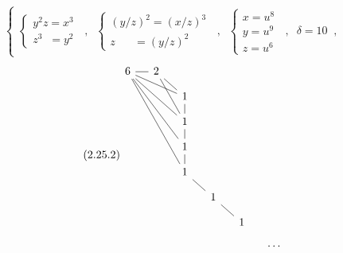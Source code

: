\begin{equation}\tag{2.25.2}
\left\{
\begin{array}{l}
\left\{\begin{array}{l} y^{2}z = x^{3} \\ z^{3} \;\; = y^{2} \end{array}\right. \;\;,\;\;
\left\{\begin{array}{l} (y/z)^{2} = (x/z)^{3} \\ z \;\;\;\;\;\; = (y/z)^{2} \end{array}\right. \;\;,\;\;
\left\{\begin{array}{l} x = u^{8} \\ y = u^{9} \\ z = u^{6} \end{array}\right. \;\;,\;\; \delta = 10 \;\;,
\end{array}
\right.
\end{equation}
\begin{equation}\tag{2.25.2}
\begin{tikzcd}[column sep=small, row sep=small]
6 \arrow[r, dash] \arrow[rrd, dash] \arrow[rrdd, dash] \arrow[rrddd, dash] \arrow[rrdddd, dash] & 2 \arrow[rd, dash] \arrow[rdd, dash] & {} & {} & {} & {} \\
{} & {} & 1 \arrow[d, dash] & {} & {} & {} \\
{} & {} & 1 \arrow[d, dash] & {} & {} & {} \\
{} & {} & 1 \arrow[d, dash] & {} & {} & {} \\
{} & {} & 1 \arrow[rd, dash] & {} & {} & {} \\
{} & {} & {} & 1 \arrow[rd, dash] & {} & {} \\
{} & {} & {} & {} & 1 & {} \\
{} & {} & {} & {} & {} & \cdots
\end{tikzcd}
\end{equation}
